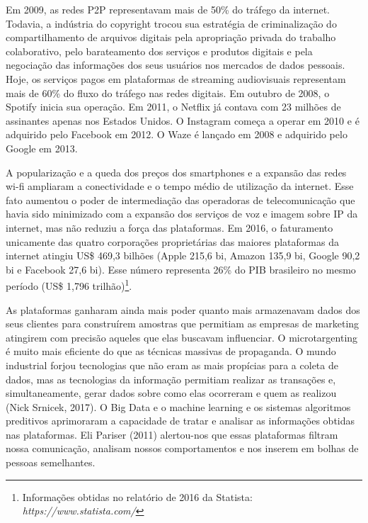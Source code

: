 Em 2009, as redes P2P representavam mais de 50\% do tráfego da internet.
Todavia, a indústria do copyright trocou sua estratégia de
criminalização do compartilhamento de arquivos digitais pela apropriação
privada do trabalho colaborativo, pelo barateamento dos serviços e
produtos digitais e pela negociação das informações dos seus usuários
nos mercados de dados pessoais. Hoje, os serviços pagos em plataformas
de streaming audiovisuais representam mais de 60\% do fluxo do tráfego
nas redes digitais. Em outubro de 2008, o Spotify inicia sua operação.
Em 2011, o Netflix já contava com 23 milhões de assinantes apenas nos
Estados Unidos. O Instagram começa a operar em 2010 e é adquirido pelo
Facebook em 2012. O Waze é lançado em 2008 e adquirido pelo Google em
2013.

A popularização e a queda dos preços dos smartphones e a expansão das
redes wi-fi ampliaram a conectividade e o tempo médio de utilização da
internet. Esse fato aumentou o poder de intermediação das operadoras de
telecomunicação que havia sido minimizado com a expansão dos serviços de
voz e imagem sobre IP da internet, mas não reduziu a força das
plataformas. Em 2016, o faturamento unicamente das quatro corporações
proprietárias das maiores plataformas da internet atingiu US\$ 469,3
bilhões (Apple 215,6 bi, Amazon 135,9 bi, Google 90,2 bi e Facebook 27,6
bi). Esse número representa 26\% do PIB brasileiro no mesmo período
(US\$ 1,796 trilhão)\footnote{Informações obtidas no relatório de 2016
  da Statista: \emph{https://www.statista.com/}}.

As plataformas ganharam ainda mais poder quanto mais armazenavam dados
dos seus clientes para construírem amostras que permitiam as empresas de
marketing atingirem com precisão aqueles que elas buscavam influenciar.
O microtargenting é muito mais eficiente do que as técnicas massivas de
propaganda. O mundo industrial forjou tecnologias que não eram as mais
propícias para a coleta de dados, mas as tecnologias da informação
permitiam realizar as transações e, simultaneamente, gerar dados sobre
como elas ocorreram e quem as realizou (Nick Srnicek, 2017). O Big Data
e o machine learning e os sistemas algoritmos preditivos aprimoraram a
capacidade de tratar e analisar as informações obtidas nas plataformas.
Eli Pariser (2011) alertou-nos que essas plataformas filtram nossa
comunicação, analisam nossos comportamentos e nos inserem em bolhas de
pessoas semelhantes.

